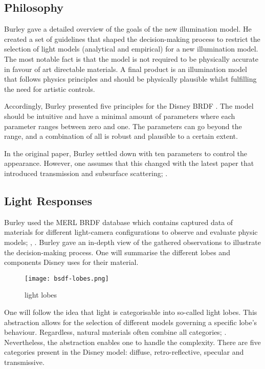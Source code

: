\subsection*{Philosophy}

Burley \cite{burley_physically_2012} gave a detailed overview of the goals of the new illumination model.
He created a set of guidelines that shaped the decision-making process to restrict the selection of light models (analytical and empirical) for a new illumination model.
The most notable fact is that the model is not required to be physically accurate in favour of art directable materials.
A final product is an illumination model that follows physics principles and should be physically plausible whilst fulfilling the need for artistic controls.

Accordingly, Burley presented five principles for the Disney BRDF \cite{burley_physically_2012}.
The model should be intuitive and have a minimal amount of parameters where each parameter ranges between zero and one.
The parameters can go beyond the range, and a combination of all is robust and plausible to a certain extent.

In the original paper, Burley \cite{burley_physically_2012} settled down with ten parameters to control the appearance.
However, one assumes that this changed with the latest paper that introduced transmission and subsurface scattering; \cite{burley_extending_2015}. 

\subsection*{Light Responses}

Burley used the MERL BRDF database which contains captured data of materials for different light-camera configurations to observe and evaluate physic models; \cite{matusik_data-driven_2003}, \cite{burley_physically_2012}.
Burley gave an in-depth view of the gathered observations to illustrate the decision-making process.
One will summarise the different lobes and components Disney uses for their material.

\begin{figure}[h]
\centering
\texttt{[image: bsdf-lobes.png]}
\caption[]{light lobes}
\label{fig:lobes}
\end{figure}

One will follow the idea that light is categorisable into so-called light lobes.
This abstraction allows for the selection of different models governing a specific lobe's behaviour.
Regardless, natural materials often combine all categories; \cite{cook_reflectance_1982}.
Nevertheless, the abstraction enables one to handle the complexity.
There are five categories present in the Disney model: diffuse, retro-reflective, specular and transmissive.

